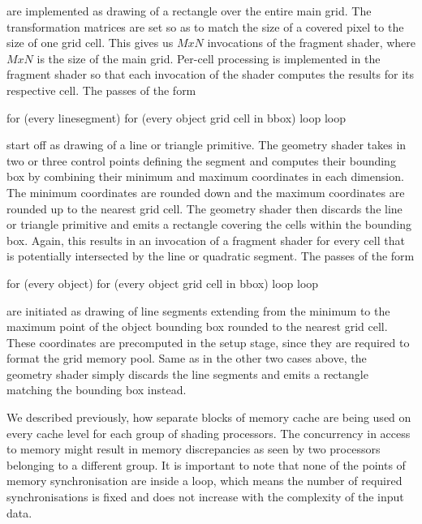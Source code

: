\documentclass[11pt,a4paper,twoside]{article}
\newenvironment {code}{\footnotesize}{\normalsize}
\begin{document}
are implemented as drawing of a rectangle over the entire main grid. The transformation matrices are set so as to match the size of a covered pixel to the size of one grid cell. This gives us $M x N$ invocations of the fragment shader, where $M x N$ is the size of the main grid. Per-cell processing is implemented in the fragment shader so that each invocation of the shader computes the results for its respective cell. The passes of the form
\begin{code}
\begin {verbatimtab}[3]
for (every line\quad segment)
	for (every object grid cell in bbox)
	loop
loop
\end {verbatimtab}
\end{code}

start off as drawing of a line or triangle primitive. The geometry shader takes in two or three control points defining the segment and computes their bounding box by combining their minimum and maximum coordinates in each dimension. The minimum coordinates are rounded down and the maximum coordinates are rounded up to the nearest grid cell. The geometry shader then discards the line or triangle primitive and emits a rectangle covering the cells within the bounding box. Again, this results in an invocation of a fragment shader for every cell that is potentially intersected by the line or quadratic segment. The passes of the form
\begin{code}
\begin {verbatimtab}[3]
for (every object)
	for (every object grid cell in bbox)
	loop
loop
\end {verbatimtab}
\end{code}

are initiated as drawing of line segments extending from the minimum to the maximum point of the object bounding box rounded to the nearest grid cell. These coordinates are precomputed in the setup stage, since they are required to format the grid memory pool. Same as in the other two cases above, the geometry shader simply discards the line segments and emits a rectangle matching the bounding box instead.

We described previously, how separate blocks of memory cache are being used on every cache level for each group of shading processors. The concurrency in access to memory might result in memory discrepancies as seen by two processors belonging to a different group. It is important to note that none of the points of memory synchronisation are inside a loop, which means the number of required synchronisations is fixed and does not increase with the complexity of the input data. 
\end{document}

